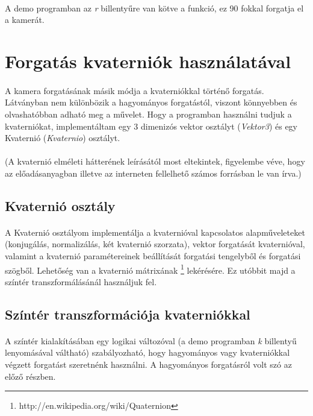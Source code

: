 \documentclass[10pt,a4paper]{article}
\begin{document}
\paragraph*{}
A demo programban az \textit{r} billentyűre van kötve a funkció, ez 90 fokkal forgatja el a kamerát.
\section*{Forgatás kvaterniók használatával}
\paragraph*{}
A kamera forgatásának másik módja a kvaterniókkal történő forgatás. Látványban nem különbözik a hagyományos forgatástól, viszont könnyebben és olvashatóbban adható meg a művelet. Hogy a programban használni tudjuk a kvaterniókat, implementáltam egy 3 dimenizós vektor osztályt (\textit{Vektor3}) és egy Kvaternió
 (\textit{Kvaternio}) osztályt.
\paragraph*{}
(A kvaternió elméleti hátterének leírásától most eltekintek, figyelembe véve, hogy az előadásanyagban illetve az interneten fellelhető számos forrásban le van írva.)
\subsection*{Kvaternió osztály}
\paragraph*{}
A Kvaternió osztályom implementálja a kvaternióval kapcsolatos alapműveleteket (konjugálás, normalizálás, két kvaternió szorzata), vektor forgatását kvaternióval, valamint a kvaternió paramétereinek beállítását forgatási tengelyből és forgatási szögből. Lehetőség van a kvaternió mátrixának \footnote{http://en.wikipedia.org/wiki/Quaternion} lekérésére. Ez utóbbit majd a színtér transzformálásánál használjuk fel.
\subsection*{Színtér transzformációja kvaterniókkal}
\paragraph*{}
A színtér kialakításában egy logikai változóval (a demo programban \textit{k} billentyű lenyomásával váltható) szabályozható, hogy hagyományos vagy kvaterniókkal végzett forgatást szeretnénk használni. A hagyományos forgatásról volt szó az előző részben.
\end{document}
